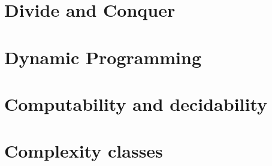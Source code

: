 








\tableofcontents
\newpage
{}



\part{Divide and Conquer}
\part{Dynamic Programming}











\part{Computability and decidability}
\part{Complexity classes}

